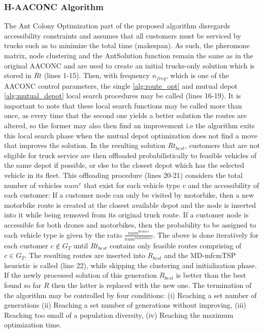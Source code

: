 \documentclass{article}
\begin{document}
	\subsubsection{H-AACONC Algorithm}
	The Ant Colony Optimization part of the proposed algorithm disregards accessibility constraints and assumes that all customers must be serviced by trucks such as to minimize the total time (makespan). As such, the pheromone matrix, node clustering and the AntSolution function remain the same as in the original AACONC and are used to create an initial trucks-only solution which is stored in $Rt$ (lines 1-15). Then, with frequency $n_{freq}$, which is one of the AACONC control parameters, the single \ref{alg:route_opt} and mutual depot \ref{alg:mutual_depot} local search procedures may be called (lines 16-19). It is important to note that these local search functions may be called more than once, as every time that the second one yields a better solution the routes are altered, so the former may also then find an improvement i.e the algorithm exits this local search phase when the mutual depot optimization does not find a move that improves the solution. In the resulting solution $Rt_{best}$, customers that are not eligible for truck service are then offloaded probabilistically to feasible vehicles of the same depot if possible, or else to the closest depot which has the selected vehicle in its fleet. This offloading procedure (lines 20-21) considers the total number of vehicles $num^{v}$ that exist for each vehicle type $v$ and the accessibility of each customer: If a customer node can only be visited by motorbike, then a new motorbike route is created at the closest available depot and the node is inserted into it while being removed from its original truck route. If a customer node is accessible for both drones and motorbikes, then the probability to be assigned to each vehicle type is given by the ratio $\frac{num^{drones}}{num^{motorbikes}}$. The above is done iteratively for each customer $c\notin G_T$ until $Rt_{best}$ contains only feasible routes comprising of $c\in G_T$.
	The resulting routes are inserted into $R_{best}$ and the MD-mfcmTSP heuristic is called (line 22), while skipping the clustering and initialization phase. If the newly processed solution of this generation $R_{best}$ is better than the best found so far $R$ then the latter is replaced with the new one. The termination of the algorithm may be controlled by four conditions: (i) Reaching a set number of generations (ii) Reaching a set number of generations without improving, (iii) Reaching too small of a population diversity, (iv) Reaching the maximum optimization time.
	\;
\end{document}
